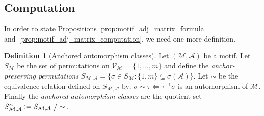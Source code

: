 \documentclass[12pt,draft]{ociamthesis}
\theoremstyle{plain}
\theoremstyle{definition}
\newtheorem{definition}{Definition}[chapter]
\theoremstyle{remark}
\newcommand\ca[1]{\mathcal{#1}}
\begin{document}
\subsection{Computation} \label{sec:graphs_computation}

In order to state Propositions \ref{prop:motif_adj_matrix_formula}
and~\ref{prop:motif_adj_matrix_computation}, we need one more definition.

\begin{definition}[Anchored automorphism classes]
  Let $(\ca{M,A})$ be a motif.
  Let $S_\ca{M}$ be the set of permutations on $ \ca{V_M} = \{ 1, \ldots, m \}$
  and define the \emph{anchor-preserving permutations} $S_\ca{M,A} = \{ \sigma
  \in S_\ca{M} : \{1,m\} \subseteq \sigma(\ca{A}) \}$.
  Let $\sim$ be the equivalence relation defined on $S_\ca{M,A}$ by: $\sigma
  \sim \tau \iff \tau^{-1} \sigma$ is an automorphism of $\ca{M}$.
  Finally the \emph{anchored automorphism classes} are the quotient set
  $S_\ca{M,A}^\sim \vcentcolon= S_\ca{M,A} \ \big/ \sim$\,.
\end{definition}
\end{document}
